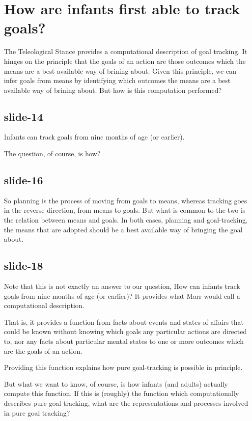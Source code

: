 \documentclass[12pt,\papersize]{extarticle}
\begin{document}
 
 
\section{How are infants first able to track goals?}
 
The Teleological Stance provides a computational description of goal tracking.
It hinges on the principle that the goals of an action are those outcomes which the means are a
best available way of brining about.
Given this principle, we can infer goals from means by identifying which outcomes the means 
are a best available way of brining about.
But how is this computation performed?
 
\subsection{slide-14}
Infants can track goals from nine months of age (or earlier).
 
The question, of course, is how?
 
\subsection{slide-16}
So planning is the process of moving from goals to means,
whereas tracking goes in the reverse direction, from means to goals.
But what is common to the two is the relation between means and goals.
In both cases, planning and goal-tracking, the means that are adopted should be a best available
way of bringing the goal about.
 
\subsection{slide-18}
Note that this is not exactly an answer to our question,
How can infants track goals from nine months of age (or earlier)?
It provides what Marr would call a computational description.
 
That is, it provides a function
from 
facts about events and states of affairs that could be known without knowing which goals any
particular actions are directed to, nor any facts about particular mental states
to 
one or more outcomes which are the goals of an action.
 
Providing this function explains how pure goal-tracking is possible in principle.
 
But what we want to know, of course, is how infants (and adults) actually compute this function.
If this is (roughly) the function which computationally describes pure goal tracking,
what are the representations and processes involved in pure goal tracking?
 
\end{document}
